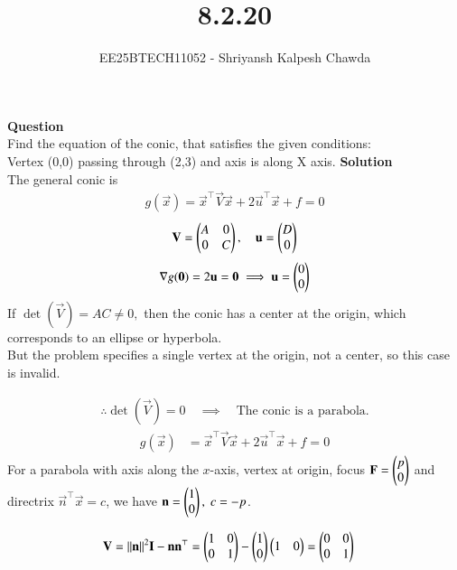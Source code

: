 \documentclass[article]{IEEEtran}
\begin{document}
	\title{8.2.20}
	\author{EE25BTECH11052 - Shriyansh Kalpesh Chawda}
	\maketitle
\textbf{Question}\\
 Find the equation of the conic, that satisfies the given
 conditions:\\
Vertex (0,0) passing through (2,3) and axis is along X axis.
\textbf{Solution}\\
The general conic is 
\begin{align}
 g(\vec{x}) = \vec{x}^\top \vec{V}\vec{x} + 2\vec{u}^\top \vec{x} + f = 0
\end{align}
\begin{align}
	\mathbf{V} = \begin{pmatrix}A & 0 \\ 0 & C\end{pmatrix}, \quad 
	\mathbf{u} = \begin{pmatrix}D \\ 0\end{pmatrix}
\end{align}
\begin{align}
\nabla g(\mathbf{0}) = 2\mathbf{u} = \mathbf{0} 
	\implies \mathbf{u} = \begin{pmatrix}0 \\ 0\end{pmatrix}
\end{align}
If $ \det(\vec{V}) = AC \neq 0,$ then the conic has a center at the origin, which corresponds to an ellipse or hyperbola.\\
But the problem specifies a single vertex at the origin, not a center, so this case is invalid.


\begin{align}
	\therefore \det(\vec{V}) = 0 \quad \implies \quad \text{The conic is a parabola.}
\end{align}
\begin{align}
	g(\vec{x}) &= \vec{x}^\top \vec{V}\vec{x} + 2\vec{u}^\top \vec{x} + f = 0 
\end{align}
For a parabola with axis along the $x$-axis, vertex at origin,  
focus $\mathbf{F} = \begin{pmatrix}p \\ 0\end{pmatrix}$ and directrix $\vec{n}^\top \vec{x} = c$,  
we have $\mathbf{n} = \begin{pmatrix}1 \\ 0\end{pmatrix}, \; c = -p$.

\begin{align}
	\mathbf{V} &= \|\mathbf{n}\|^2 \mathbf{I} - \mathbf{n}\mathbf{n}^\top 
	= \begin{pmatrix}1 & 0 \\ 0 & 1\end{pmatrix} - \begin{pmatrix}1 \\ 0\end{pmatrix}\begin{pmatrix}1 & 0\end{pmatrix} 
	= \begin{pmatrix}0 & 0 \\ 0 & 1\end{pmatrix}
\end{align}
\end{document}
